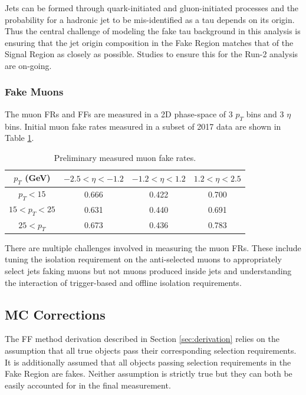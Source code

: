 \pagebreak

Jets can be formed through quark-initiated and gluon-initiated processes and the probability for a hadronic jet to be mis-identified as a tau depends on its origin. Thus the central challenge of modeling the fake tau background in this analysis is ensuring that the jet origin composition in the Fake Region matches that of the Signal Region as closely as possible. Studies to ensure this for the Run-2 analysis are on-going.\\ 

\subsubsection{Fake Muons}
The muon FRs and FFs are measured in a 2D phase-space of 3 $p_T$ bins and 3 $\eta$ bins. Initial muon fake rates measured in a subset of 2017 data are shown in Table \ref{tab:muon_frs}.

\begin{table}[htb!]
    \centering
    \begin{tabular}{|c|c|c|c|}
    \hline
    $p_T$ (GeV) & $-2.5<\eta<-1.2$ & $-1.2<\eta<1.2$ & $1.2<\eta<2.5$\\
    \hline
    $p_T<15$ & 0.666 & 0.422 & 0.700\\
    $15<p_T<25$ & 0.631 & 0.440 & 0.691\\
    $25<p_T$ & 0.673 & 0.436 & 0.783\\
    \hline
    \end{tabular}
    \caption{Preliminary measured muon fake rates.}
    \label{tab:muon_frs}
\end{table}

There are multiple challenges involved in measuring the muon FRs. These include tuning the isolation requirement on the anti-selected muons to appropriately select jets faking muons but not muons produced inside jets and understanding the interaction of trigger-based and offline isolation requirements.

\subsection{MC Corrections}\label{sec:mc_corr}
The FF method derivation described in Section \ref{sec:derivation} relies on the assumption that all true objects pass their corresponding selection requirements. It is additionally assumed that all objects passing selection requirements in the Fake Region are fakes. Neither assumption is strictly true but they can both be easily accounted for in the final measurement.\\

